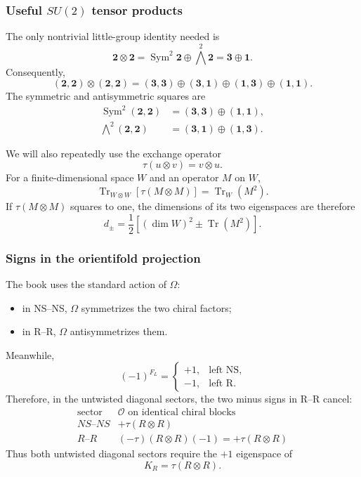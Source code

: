 \documentclass[
  10pt,
  a4paper,
  openany]{book}
\providecommand{\tightlist}{%
  \setlength{\itemsep}{0pt}\setlength{\parskip}{0pt}}
\begin{document}
\subsubsection{\texorpdfstring{Useful \(SU(2)\) tensor
products}{Useful SU(2) tensor products}}\label{useful-su2-tensor-products}

The only nontrivial little-group identity needed is \[
\mathbf2\otimes\mathbf2
=
\operatorname{Sym}^2\mathbf2
\oplus
\bigwedge^2\mathbf2
=
\mathbf3\oplus\mathbf1.
\] Consequently, \[
(\mathbf2,\mathbf2)\otimes(\mathbf2,\mathbf2)
=
(\mathbf3,\mathbf3)
\oplus
(\mathbf3,\mathbf1)
\oplus
(\mathbf1,\mathbf3)
\oplus
(\mathbf1,\mathbf1).
\] The symmetric and antisymmetric squares are \[
\begin{aligned}
\operatorname{Sym}^2(\mathbf2,\mathbf2)
&=
(\mathbf3,\mathbf3)
\oplus
(\mathbf1,\mathbf1),\\
\bigwedge^2(\mathbf2,\mathbf2)
&=
(\mathbf3,\mathbf1)
\oplus
(\mathbf1,\mathbf3).
\end{aligned}
\]

We will also repeatedly use the exchange operator \[
\tau(u\otimes v)=v\otimes u.
\] For a finite-dimensional space \(W\) and an operator \(M\) on \(W\),
\[
\operatorname{Tr}_{W\otimes W}
\left[
\tau(M\otimes M)
\right]
=
\operatorname{Tr}_W(M^2).
\] If \(\tau(M\otimes M)\) squares to one, the dimensions of its two
eigenspaces are therefore \[
d_\pm
=
\frac12
\left[
(\dim W)^2
\pm
\operatorname{Tr}(M^2)
\right].
\]

\subsubsection{Signs in the orientifold
projection}\label{signs-in-the-orientifold-projection}

The book uses the standard action of \(\Omega\):

\begin{itemize}
\tightlist
\item
  in NS--NS, \(\Omega\) symmetrizes the two chiral factors;
\item
  in R--R, \(\Omega\) antisymmetrizes them.
\end{itemize}

Meanwhile, \[
(-1)^{F_L}
=
\begin{cases}
+1,&\text{left NS},\\
-1,&\text{left R}.
\end{cases}
\] Therefore, in the untwisted diagonal sectors, the two minus signs in
R--R cancel: \[
\begin{array}{c|c}
\text{sector}&\mathcal O\text{ on identical chiral blocks}\\ \hline
NS\text{--}NS&+\tau(R\otimes R)\\
R\text{--}R&(-\tau)(R\otimes R)(-1)
=+\tau(R\otimes R)
\end{array}
\] Thus both untwisted diagonal sectors require the \(+1\) eigenspace of
\[
K_R=\tau(R\otimes R).
\]
\end{document}
